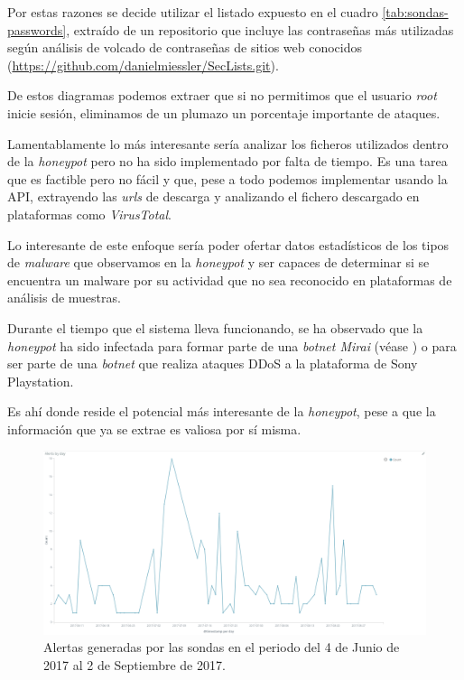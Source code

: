 Por estas razones se decide utilizar el listado expuesto en el cuadro \ref{tab:sondas-passwords}, extraído de un repositorio que incluye las contraseñas
más utilizadas según análisis de volcado de contraseñas de sitios web conocidos (\href{https://github.com/danielmiessler/SecLists.git}{https://github.com/danielmiessler/SecLists.git}).

De estos diagramas podemos extraer que si no permitimos que el usuario \emph{root} inicie sesión, eliminamos de un plumazo un porcentaje importante de ataques.

Lamentablamente lo más interesante sería analizar los ficheros utilizados dentro de la \emph{honeypot} pero no ha sido implementado por falta de tiempo. Es una tarea
que es factible pero no fácil y que, pese a todo podemos implementar usando la API, extrayendo las \emph{urls} de descarga y analizando el fichero descargado en plataformas como
\emph{VirusTotal}.

Lo interesante de este enfoque sería poder ofertar datos estadísticos de los tipos de \emph{malware} que observamos en la \emph{honeypot} y ser capaces de determinar si se encuentra un malware por
su actividad que no sea reconocido en plataformas de análisis de muestras.

Durante el tiempo que el sistema lleva funcionando, se ha observado que la \emph{honeypot} ha sido infectada para formar parte de una \emph{botnet Mirai} (véase \cite{wiki-mirai})
o para ser parte de una \emph{botnet} que realiza ataques DDoS a la plataforma de Sony Playstation.

Es ahí donde reside el potencial más interesante de la \emph{honeypot}, pese a que la información que ya se extrae es valiosa por sí misma.

\begin{figure}
    \centering
      \includegraphics[scale=0.3]{images/ElasticAlertsByDay}
    \caption{Alertas generadas por las sondas en el periodo del 4 de Junio de 2017 al 2 de Septiembre de 2017.}
    \label{fig:data-alerts-by-day}
  \end{figure}

